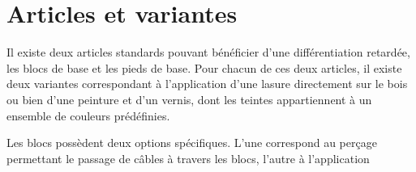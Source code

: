 \section{Articles et variantes}

Il existe deux articles standards pouvant bénéficier d'une différentiation
retardée, les blocs de base et les pieds de base.
Pour chacun de ces deux articles, il existe deux variantes correspondant
à l'application d'une lasure directement sur le bois ou bien d'une peinture
et d'un vernis, dont les teintes appartiennent à un ensemble de couleurs
prédéfinies.

Les blocs possèdent deux options spécifiques. L'une correspond au perçage
permettant le passage de câbles à travers les blocs, l'autre à l'application

